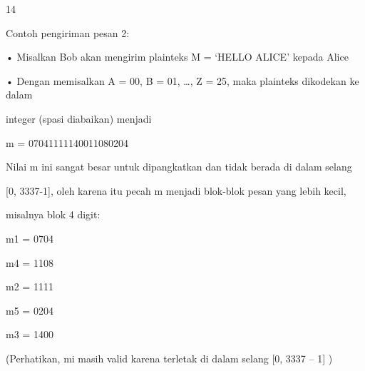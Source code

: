 \documentclass{article}
\begin{document}

14

Contoh pengiriman pesan 2:

• Misalkan Bob akan mengirim plainteks  M = ‘HELLO ALICE’ kepada Alice

• Dengan memisalkan A = 00, B = 01, …, Z = 25, maka plainteks dikodekan ke dalam 

integer  (spasi diabaikan) menjadi 

m = 07041111140011080204

 Nilai m ini sangat besar untuk dipangkatkan dan tidak berada di dalam selang         

[0, 3337-1], oleh karena itu pecah m menjadi blok-blok pesan yang lebih kecil, 

misalnya blok 4 digit:


m1 = 0704

m4 = 1108

m2 = 1111

m5 = 0204

m3 = 1400

   (Perhatikan, mi masih valid karena terletak di dalam selang [0, 3337 – 1] )
\end{document}
